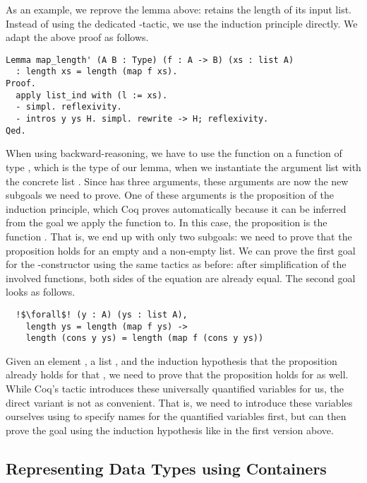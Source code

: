 As an example, we reprove the lemma above:  retains the length of its input list.
Instead of using the dedicated -tactic, we use the induction principle directly.
We adapt the above proof as follows.

\begin{verbatim}
Lemma map_length' (A B : Type) (f : A -> B) (xs : list A)
  : length xs = length (map f xs).
Proof.
  apply list_ind with (l := xs).
  - simpl. reflexivity.
  - intros y ys H. simpl. rewrite -> H; reflexivity.
Qed.
\end{verbatim}

When using backward-reasoning, we have to use the function  on a function of type , which is the type of our lemma, when we instantiate the argument list  with the concrete list .
Since  has three arguments, these arguments are now the new subgoals we need to prove.
One of these arguments is the proposition  of the induction principle, which Coq proves automatically because it can be inferred from the goal we apply the function to.
In this case, the proposition is the function .
That is, we end up with only two subgoals: we need to prove that the proposition holds for an empty and a non-empty list.
We can prove the first goal for the -constructor using the same tactics as before: after simplification of the involved functions, both sides of the equation are already equal.
The second goal looks as follows.

\begin{verbatim}
  !$\forall$! (y : A) (ys : list A),
    length ys = length (map f ys) ->
    length (cons y ys) = length (map f (cons y ys))
\end{verbatim}

Given an element ,  a list , and the induction hypothesis that the proposition already holds for that , we need to prove that the proposition holds for  as well.
While Coq's  tactic introduces these universally quantified variables for us, the direct variant is not as convenient.
That is, we need to introduce these variables ourselves using  to specify names for the quantified variables first, but can then prove the goal using the induction hypothesis like in the first version above.

\subsection{Representing Data Types using Containers}
\label{sub:container}

